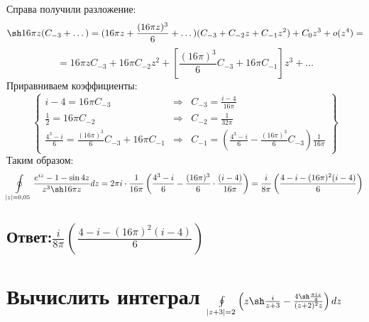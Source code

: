 \documentclass{article}
\begin{document}
	Справа получили разложение:
	\[\sh16\pi z (C_{-3} +\dots) = (16\pi z + \frac{(16\pi z)^3}{6} + \dots)(C_{-3} + C_{-2}z + C_{-1}z^2) + C_{0}z^3 + o(z^4) = \]
	\[=16\pi z C_{-3} + 16 \pi C_{-2}z^2 + \left[\frac{(16\pi)^3}{6}C_{-3} + 16\pi C_{-1}\right]z^3 + \dots\]
	Приравниваем коэффициенты:
	\[\begin{Bmatrix}
		i-4 = 16\pi C_{-3} & \Rightarrow &C_{-3} =  \frac{i-4}{16\pi} \\
		\frac{1}{2} = 16\pi C_{-2} & \Rightarrow & C_{-2} = \frac{1}{32\pi}\\
		\frac{4^3-i}{6} = \frac{(16\pi)^3}{6}C_{-3} + 16\pi C_{-1} & \Rightarrow & C_{-1} = \left(\frac{4^3 - i}{6} - \frac{(16\pi)^3}{6}C_{-3}\right)\frac{1}{16\pi}
		
	\end{Bmatrix}\]
	Таким образом:
	\[\oint\limits_{|z|=0,05} \frac{e^{iz} - 1 -\sin 4z}{z^3 \sh 16 \pi z}dz = 2\pi i \cdot \frac{1}{16\pi}\left(\frac{4^3-i}{6} - \frac{(16\pi)^3}{6}\cdot\frac{(i-4)}{16\pi}\right) = \frac{i}{8\pi}\left(\frac{4-i - (16\pi)^2(i-4)}{6}\right)\]
	\subsection{Ответ:$\frac{i}{8\pi}\left(\frac{4-i - (16\pi)^2(i-4)}{6}\right)$}
	
	
	\section{Вычислить интеграл $\oint\limits_{|z+3|=2}\left(z \sh \frac{i}{z+3} - \frac{4 \sh \frac{\pi i z}{4}}{(z+2)^2z}\right) dz$}
\end{document}
